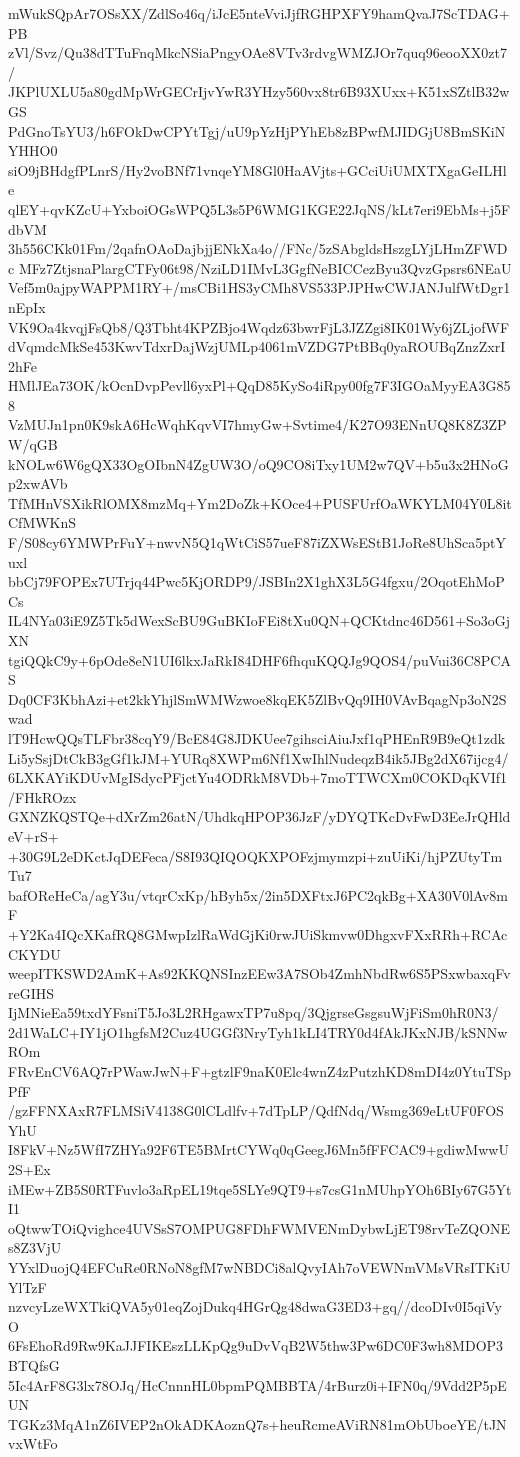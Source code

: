 mWukSQpAr7OSsXX/ZdlSo46q/iJcE5nteVviJjfRGHPXFY9hamQvaJ7ScTDAG+PB
zVl/Svz/Qu38dTTuFnqMkcNSiaPngyOAe8VTv3rdvgWMZJOr7quq96eooXX0zt7/
JKPlUXLU5a80gdMpWrGECrIjvYwR3YHzy560vx8tr6B93XUxx+K51xSZtlB32wGS
PdGnoTsYU3/h6FOkDwCPYtTgj/uU9pYzHjPYhEb8zBPwfMJIDGjU8BmSKiNYHHO0
siO9jBHdgfPLnrS/Hy2voBNf71vnqeYM8Gl0HaAVjts+GCciUiUMXTXgaGeILHle
qlEY+qvKZcU+YxboiOGsWPQ5L3s5P6WMG1KGE22JqNS/kLt7eri9EbMs+j5FdbVM
3h556CKk01Fm/2qafnOAoDajbjjENkXa4o//FNc/5zSAbgldsHszgLYjLHmZFWDc
MFz7ZtjsnaPlargCTFy06t98/NziLD1IMvL3GgfNeBICCezByu3QvzGpsrs6NEaU
Vef5m0ajpyWAPPM1RY+/msCBi1HS3yCMh8VS533PJPHwCWJANJulfWtDgr1nEpIx
VK9Oa4kvqjFsQb8/Q3Tbht4KPZBjo4Wqdz63bwrFjL3JZZgi8IK01Wy6jZLjofWF
dVqmdcMkSe453KwvTdxrDajWzjUMLp4061mVZDG7PtBBq0yaROUBqZnzZxrI2hFe
HMlJEa73OK/kOcnDvpPevll6yxPl+QqD85KySo4iRpy00fg7F3IGOaMyyEA3G858
VzMUJn1pn0K9skA6HcWqhKqvVI7hmyGw+Svtime4/K27O93ENnUQ8K8Z3ZPW/qGB
kNOLw6W6gQX33OgOIbnN4ZgUW3O/oQ9CO8iTxy1UM2w7QV+b5u3x2HNoGp2xwAVb
TfMHnVSXikRlOMX8mzMq+Ym2DoZk+KOce4+PUSFUrfOaWKYLM04Y0L8itCfMWKnS
F/S08cy6YMWPrFuY+nwvN5Q1qWtCiS57ueF87iZXWsEStB1JoRe8UhSca5ptYuxl
bbCj79FOPEx7UTrjq44Pwc5KjORDP9/JSBIn2X1ghX3L5G4fgxu/2OqotEhMoPCs
IL4NYa03iE9Z5Tk5dWexScBU9GuBKIoFEi8tXu0QN+QCKtdnc46D561+So3oGjXN
tgiQQkC9y+6pOde8eN1UI6lkxJaRkI84DHF6fhquKQQJg9QOS4/puVui36C8PCAS
Dq0CF3KbhAzi+et2kkYhjlSmWMWzwoe8kqEK5ZlBvQq9IH0VAvBqagNp3oN2Swad
lT9HcwQQsTLFbr38cqY9/BcE84G8JDKUee7gihsciAiuJxf1qPHEnR9B9eQt1zdk
Li5ySsjDtCkB3gGf1kJM+YURq8XWPm6Nf1XwIhlNudeqzB4ik5JBg2dX67ijcg4/
6LXKAYiKDUvMgISdycPFjctYu4ODRkM8VDb+7moTTWCXm0COKDqKVIf1/FHkROzx
GXNZKQSTQe+dXrZm26atN/UhdkqHPOP36JzF/yDYQTKcDvFwD3EeJrQHldeV+rS+
+30G9L2eDKctJqDEFeca/S8I93QIQOQKXPOFzjmymzpi+zuUiKi/hjPZUtyTmTu7
bafOReHeCa/agY3u/vtqrCxKp/hByh5x/2in5DXFtxJ6PC2qkBg+XA30V0lAv8mF
+Y2Ka4IQcXKafRQ8GMwpIzlRaWdGjKi0rwJUiSkmvw0DhgxvFXxRRh+RCAcCKYDU
weepITKSWD2AmK+As92KKQNSInzEEw3A7SOb4ZmhNbdRw6S5PSxwbaxqFvreGIHS
IjMNieEa59txdYFsniT5Jo3L2RHgawxTP7u8pq/3QjgrseGsgsuWjFiSm0hR0N3/
2d1WaLC+IY1jO1hgfsM2Cuz4UGGf3NryTyh1kLI4TRY0d4fAkJKxNJB/kSNNwROm
FRvEnCV6AQ7rPWawJwN+F+gtzlF9naK0Elc4wnZ4zPutzhKD8mDI4z0YtuTSpPfF
/gzFFNXAxR7FLMSiV4138G0lCLdlfv+7dTpLP/QdfNdq/Wsmg369eLtUF0FOSYhU
I8FkV+Nz5WfI7ZHYa92F6TE5BMrtCYWq0qGeegJ6Mn5fFFCAC9+gdiwMwwU2S+Ex
iMEw+ZB5S0RTFuvlo3aRpEL19tqe5SLYe9QT9+s7csG1nMUhpYOh6BIy67G5YtI1
oQtwwTOiQvighce4UVSsS7OMPUG8FDhFWMVENmDybwLjET98rvTeZQONEs8Z3VjU
YYxlDuojQ4EFCuRe0RNoN8gfM7wNBDCi8alQvyIAh7oVEWNmVMsVRsITKiUYlTzF
nzvcyLzeWXTkiQVA5y01eqZojDukq4HGrQg48dwaG3ED3+gq//dcoDIv0I5qiVyO
6FsEhoRd9Rw9KaJJFIKEszLLKpQg9uDvVqB2W5thw3Pw6DC0F3wh8MDOP3BTQfsG
5Ic4ArF8G3lx78OJq/HcCnnnHL0bpmPQMBBTA/4rBurz0i+IFN0q/9Vdd2P5pEUN
TGKz3MqA1nZ6IVEP2nOkADKAoznQ7s+heuRcmeAViRN81mObUboeYE/tJNvxWtFo
